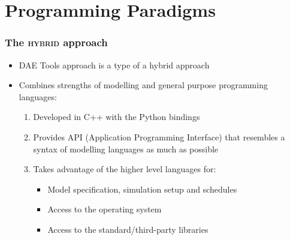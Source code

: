 \documentclass[compress,newPxFont,sthlmFooter]{beamer}
\begin{document}
\section{Programming Paradigms}

\begin{frame}
\frametitle{The \textsc{hybrid} approach}
  \begin{itemize}
    \item DAE Tools approach is a \alert{type of a hybrid approach}
    \item Combines strengths of \alert{modelling} and \alert{general purpose} programming languages:
        \begin{enumerate}
            \item \alert{Developed in C++} with the \alert{Python bindings}
            \item Provides \alert{API} (Application Programming Interface) that \alert{resembles a syntax of modelling languages}
                  as much as possible
            \item \alert{Takes advantage of the higher level languages} for:
                \begin{itemize}
                    \item Model specification, simulation setup and schedules
                    \item Access to the operating system 
                    \item Access to the standard/third-party libraries
                \end{itemize}
        \end{enumerate}
  \end{itemize}
\end{frame}
\end{document}
